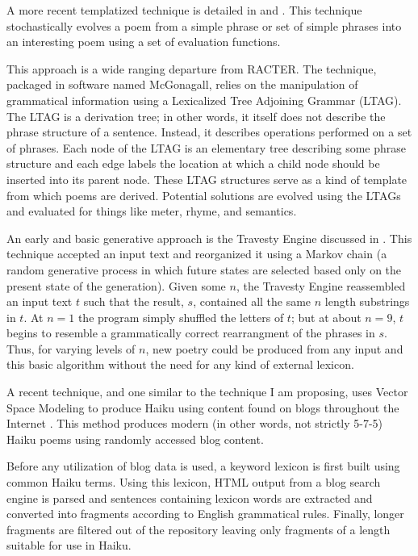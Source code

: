 \documentclass[10pt]{article}
\begin{document}
A more recent templatized technique is detailed in \cite{Manurung00} and
\cite{Manurung03}. This technique stochastically evolves a poem from a simple
phrase or set of simple phrases into an interesting poem using a set of
evaluation functions.

This approach is a wide ranging departure from RACTER. The technique, packaged
in software named McGonagall, relies on the manipulation of grammatical
information using a Lexicalized Tree Adjoining Grammar (LTAG). The LTAG is a
derivation tree; in other words, it itself does not describe the phrase
structure of a sentence. Instead, it describes operations performed on a set of
phrases. Each node of the LTAG is an elementary tree describing some phrase
structure and each edge labels the location at which a child node should be
inserted into its parent node. These LTAG structures serve as a kind of
template from which poems are derived. Potential solutions are evolved using
the LTAGs and evaluated for things like meter, rhyme, and semantics.

An early and basic generative approach is the Travesty Engine discussed in
\cite{Hart96}. This technique accepted an input text and reorganized it using a
Markov chain (a random generative process in which future states are selected
based only on the present state of the generation). Given some $n$, the
Travesty Engine reassembled an input text $t$ such that the result, $s$,
contained all the same $n$ length substrings in $t$. At $n = 1$ the program
simply shuffled the letters of $t$; but at about $n = 9$, $t$ begins to
resemble a grammatically correct rearrangment of the phrases in $s$. Thus, for
varying levels of $n$, new poetry could be produced from any input and this
basic algorithm without the need for any kind of external lexicon.

A recent technique, and one similar to the technique I am proposing, uses
Vector Space Modeling to produce Haiku using content found on blogs throughout
the Internet \cite{Wong08}. This method produces modern (in other words, not
strictly 5-7-5) Haiku poems using randomly accessed blog content. 

Before any utilization of blog data is used, a keyword lexicon is first built
using common Haiku terms. Using this lexicon, HTML output from a blog search
engine is parsed and sentences containing lexicon words are extracted and
converted into fragments according to English grammatical rules. Finally, longer
fragments are filtered out of the repository leaving only fragments of a length
suitable for use in Haiku.
\end{document}
